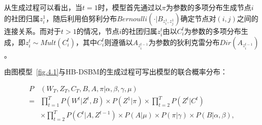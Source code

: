 从生成过程可以看出，当$t=1$时，模型首先通过以$\pi$为参数的多项分布生成节点$i$的社团归属$z_i^1$，随后利用伯努利分布$Bernoulli(\cdot|B_{z_i^1,z_j^1})$确定节点对$(i,j)$之间的连接关系。而对于$t>1$的情况，节点$i$的社团归属$z_i^t$由以$C_i^t$为参数的多项分布生成，即$z_i^t \sim Mult({C}_i^t)$，其中$C_i^t$则遵循以$A_{z_i^{t-1}}$为参数的狄利克雷分布$Dir(A_{z_i^{t-1}})$。

由图模型~\ref{fig.4.1}与HB-DSBM的生成过程可写出模型的联合概率分布：

\begin{equation}
\begin{split}
P&(W_T, Z_T, C_T, B, A, \pi | \alpha, \beta, \gamma, \mu) \\
= & \prod_{t=1}^T P(W^t | Z^t, B) \times  P(Z^1 | \pi) \times \prod_{t=2}^T P(Z^t | C^t) \\
& \times \prod_{t=2}^T P(C^t | A, Z^{t-1}) \times P(A | \mu) \times P(\pi | \gamma) \times P(B | \alpha, \beta) ,\\
\end{split}
\end{equation}






